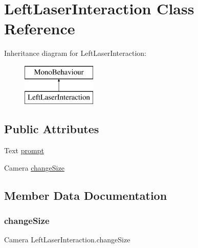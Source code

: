 \hypertarget{class_left_laser_interaction}{}\section{Left\+Laser\+Interaction Class Reference}
\label{class_left_laser_interaction}
Inheritance diagram for Left\+Laser\+Interaction\+:\begin{figure}[H]
\begin{center}
\leavevmode
\includegraphics[height=2.000000cm]{class_left_laser_interaction}
\end{center}
\end{figure}
\subsection*{Public Attributes}
\begin{DoxyCompactItemize}
\item 
Text \hyperlink{class_left_laser_interaction_a275faec30b34227624a671a326ded543}{prompt}
\item 
Camera \hyperlink{class_left_laser_interaction_a08ffd3543f4374b6d08adb625756ce7e}{change\+Size}
\end{DoxyCompactItemize}


\subsection{Member Data Documentation}
\mbox{\label{class_left_laser_interaction_a08ffd3543f4374b6d08adb625756ce7e}} 
\subsubsection{\texorpdfstring{change\+Size}{changeSize}}
{\footnotesize\ttfamily Camera Left\+Laser\+Interaction.\+change\+Size}

\mbox{\label{class_left_laser_interaction_a275faec30b34227624a671a326ded543}} 
